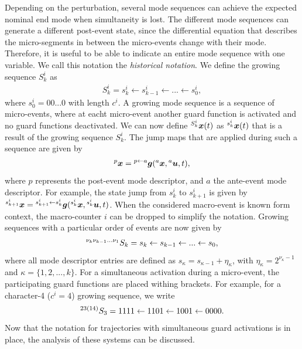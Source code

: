 \documentclass[../DC2017114Bouma.tex]{subfiles}
\begin{document}
Depending on the perturbation, several mode sequences can achieve the expected nominal end mode when simultaneity is lost. The different mode sequences can generate a different post-event state, since the differential equation that describes the micro-segments in between the micro-events change with their mode. Therefore, it is useful to be able to indicate an entire mode sequence with one variable. We call this notation the \textit{historical notation}. We define the growing sequence $S_k^i$ as 
\begin{align}
S_k^i = s_k^i\leftarrow s_{k-1}^i\leftarrow ... \leftarrow s_0^i,
\end{align}
where $s_0^i = 00...0$ with length $c^i$. A growing mode sequence is a sequence of micro-events, where at eacht micro-event another guard function is activated and no guard functions deactivated. We can now define $^{S_k^i}{\boldsymbol{x}}(t)$ as $^{s_k^i}{\boldsymbol{x}}(t)$ that is a result of the growing sequence $S_k^i$. The jump maps that are applied during such a sequence are given by
\begin{align}
\hspace{0cm}^{p}{\boldsymbol{x}} = \hspace{0cm}^{p\leftarrow a}{\boldsymbol{g}}(\hspace{0cm}^{a}{\boldsymbol{x}},\hspace{0cm}^{a}{\boldsymbol{u}},t),
\end{align}
where $p$ represents the post-event mode descriptor, and $a$ the ante-event mode descriptor. For example, the state jump from $s^i_k$ to $s^i_{k+1}$ is given by $\hspace{0cm}^{s^i_{k+1}}{\boldsymbol{x}} = \hspace{0cm}^{s^i_{k+1}\leftarrow s^i_k}{\boldsymbol{g}}(\hspace{0cm}^{s^i_k}{\boldsymbol{x}},\hspace{0cm}^{s^i_k}{\boldsymbol{u}},t)$. When the considered macro-event is known form context, the macro-counter $i$ can be dropped to simplify the notation. Growing sequences with a particular order of events are now given by
\begin{align}
\hspace{0cm}^{\nu_k \nu_{k-1}...\nu_{1}}S_k = s_k \leftarrow s_{k-1} \leftarrow ... \leftarrow s_0,
\end{align}
where all mode descriptor entries are defined as $s_{\kappa} = s_{\kappa-1} + \eta_{\kappa}$, with $\eta_{\kappa} = 2^{\nu_{\kappa}-1}$ and $\kappa = \{1,2,...,k\}$. For a simultaneous activation during a micro-event, the participating guard functions are placed withing brackets. For example, for a character-4 ($c^i = 4$) growing sequence, we write 
\begin{align}
\hspace{0cm}^{23(14)}S_3 = 1111 \leftarrow 1101 \leftarrow 1001 \leftarrow 0000.
\end{align}
Now that the notation for trajectories with simultaneous guard activations is in place, the analysis of these systems can be discussed.
%
\end{document}

